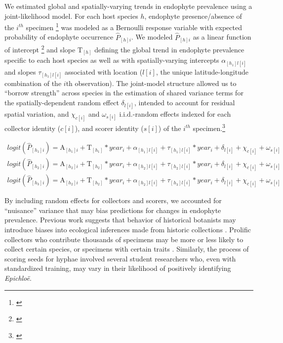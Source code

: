 \documentclass[11pt]{article}
\let\cite\citep
\newcommand{\tom}[2]{{\color{red}{#1}}\footnote{\textit{\color{red}{#2}}}}
\begin{document}
We estimated global and spatially-varying trends in endophyte prevalence using a joint-likelihood model. 
For each host species $h$, endophyte presence/absence of the $i^{th}$ specimen \tom{($P_{[h]i}$)}{Not obvious to me why you use square brackets here.} was modeled as a Bernoulli response variable with expected probability of endophyte occurrence $\hat{P}_{[h]i}$.
We modeled $\hat{P}_{[h]i}$ as a linear function of intercept \tom{$ \mathrm{A}_{[h]i}$}{I don't think there should be an $i$ subscript here. You need $i$ only where there is a covariate unique to the $i$th observation.} and slope $\mathrm{T}_{[h]}$ defining the global trend in endophyte prevalence specific to each host species as well as with spatially-varying intercepts $\alpha_{[h_{1}]l[i]}$ and slopes $\tau_{[h_{1}]l[i]}$ associated with location ($l[i]$, the unique latitude-longitude combination of the $i$th observation).
The joint-model structure allowed us to ``borrow strength'' across species in the estimation of shared variance terms for the spatially-dependent random effect $\delta_{l[i]}$, intended to account for residual spatial variation, and $\chi_{c[i]}$ and $\omega_{s[i]}$ i.i.d.-random effects indexed for each collector identity ($c[i]$), and scorer identity ($s[i]$) of the $i^{th}$ specimen.\tom{}{I don't think you need three expressions here. If you just index host as $h$ it is clear that some pieces are unique to host $h$ and others are shared across hosts.}


\begin{subequations}
	\label{eq:trends}
	\begin{align}
		logit(\hat{P}_{[h_{1}]i}) =  \mathrm{A}_{[h_{1}]i} + \mathrm{T}_{[h_{1}]}*year_i  + \alpha_{[h_{1}]l[i]} + \tau_{[h_{1}]l[i]}*year_i  + \delta_{l[i]}+ \chi_{c[i]} + \omega_{s[i]} \\
		logit(\hat{P}_{[h_{2}]i}) = \mathrm{A}_{[h_{2}]i} + \mathrm{T}_{[h_{2}]}*year_i  + \alpha_{[h_{2}]l[i]} + \tau_{[h_{2}]l[i]}*year_i  + \delta_{l[i]}+ \chi_{c[i]} + \omega_{s[i]} \\
		logit(\hat{P}_{[h_{3}]i}) = \mathrm{A}_{[h_{2}]i} + \mathrm{T}_{[h_{2}]}*year_i  + \alpha_{[h_{2}]l[i]} + \tau_{[h_{3}]l[i]}*year_i  + \delta_{l[i]}+ \chi_{c[i]} + \omega_{s[i]}
	\end{align}
\end{subequations}

By including random effects for collectors and scorers, we accounted for ``nuisance'' variance that may bias predictions for changes in endophyte prevalence.
Previous work suggests that behavior of historical botanists may introduce biases into ecological inferences made from historic collections \cite{kozlov2020biases}. 
Prolific collectors who contribute thousands of specimens may be more or less likely to collect certain species, or specimens with certain traits \cite{daru2018widespread}. 
Similarly, the process of scoring seeds for hyphae involved several student researchers who, even with standardized training, may vary in their likelihood of positively identifying \emph{Epichloë}. 
\end{document}

